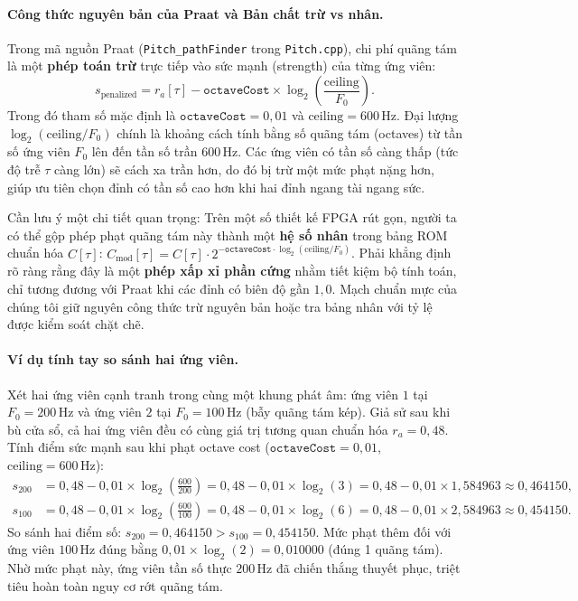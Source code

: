 \paragraph{Công thức nguyên bản của Praat và Bản chất trừ vs nhân.}
Trong mã nguồn Praat (\texttt{Pitch\_pathFinder} trong \texttt{Pitch.cpp}), chi phí quãng tám là một \textbf{phép toán trừ} trực tiếp vào sức mạnh (strength) của từng ứng viên:
\[
s_{\mathrm{penalized}} = r_a[\tau] - \texttt{octaveCost} \times \log_2\left(\frac{\mathrm{ceiling}}{F_0}\right).
\]
Trong đó tham số mặc định là $\texttt{octaveCost} = 0{,}01$ và $\mathrm{ceiling} = 600\,\text{Hz}$. Đại lượng $\log_2(\mathrm{ceiling} / F_0)$ chính là khoảng cách tính bằng số quãng tám (octaves) từ tần số ứng viên $F_0$ lên đến tần số trần $600\,\text{Hz}$. Các ứng viên có tần số càng thấp (tức độ trễ $\tau$ càng lớn) sẽ cách xa trần hơn, do đó bị trừ một mức phạt nặng hơn, giúp ưu tiên chọn đỉnh có tần số cao hơn khi hai đỉnh ngang tài ngang sức.

Cần lưu ý một chi tiết quan trọng: Trên một số thiết kế FPGA rút gọn, người ta có thể gộp phép phạt quãng tám này thành một \textbf{hệ số nhân} trong bảng ROM chuẩn hóa $C[\tau]$: $C_{\mathrm{mod}}[\tau] = C[\tau] \cdot 2^{-\texttt{octaveCost} \cdot \log_2(\mathrm{ceiling}/F_0)}$. Phải khẳng định rõ ràng rằng đây là một \textbf{phép xấp xỉ phần cứng} nhằm tiết kiệm bộ tính toán, chỉ tương đương với Praat khi các đỉnh có biên độ gần $1{,}0$. Mạch chuẩn mực của chúng tôi giữ nguyên công thức trừ nguyên bản hoặc tra bảng nhân với tỷ lệ được kiểm soát chặt chẽ.

\paragraph{Ví dụ tính tay so sánh hai ứng viên.}
Xét hai ứng viên cạnh tranh trong cùng một khung phát âm: ứng viên $1$ tại $F_0 = 200\,\text{Hz}$ và ứng viên $2$ tại $F_0 = 100\,\text{Hz}$ (bẫy quãng tám kép). Giả sử sau khi bù cửa sổ, cả hai ứng viên đều có cùng giá trị tương quan chuẩn hóa $r_a = 0{,}48$.
Tính điểm sức mạnh sau khi phạt octave cost ($\texttt{octaveCost} = 0{,}01$, $\mathrm{ceiling} = 600\,\text{Hz}$):
\begin{align*}
s_{200} &= 0{,}48 - 0{,}01 \times \log_2\left(\frac{600}{200}\right) = 0{,}48 - 0{,}01 \times \log_2(3) = 0{,}48 - 0{,}01 \times 1{,}584963 \approx 0{,}464150,\\[6pt]
s_{100} &= 0{,}48 - 0{,}01 \times \log_2\left(\frac{600}{100}\right) = 0{,}48 - 0{,}01 \times \log_2(6) = 0{,}48 - 0{,}01 \times 2{,}584963 \approx 0{,}454150.
\end{align*}
So sánh hai điểm số: $s_{200} = 0{,}464150 > s_{100} = 0{,}454150$.
Mức phạt thêm đối với ứng viên $100\,\text{Hz}$ đúng bằng $0{,}01 \times \log_2(2) = 0{,}010000$ (đúng 1 quãng tám). Nhờ mức phạt này, ứng viên tần số thực $200\,\text{Hz}$ đã chiến thắng thuyết phục, triệt tiêu hoàn toàn nguy cơ rớt quãng tám.

